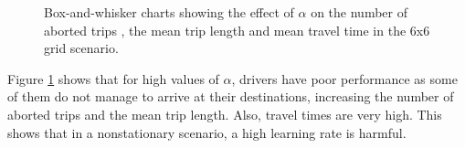 \documentclass{RITA}
\begin{document}
\begin{figure}[ht]
  \centering
  \caption{Box-and-whisker charts showing the effect of $\alpha$ on the number of aborted trips , the mean trip length  and mean travel time  in the 6x6 grid scenario.}
  \label{fig:qLearningAlpha-grid}
\end{figure}

Figure \ref{fig:qLearningAlpha-grid} shows that for high values of $\alpha$, drivers have poor performance as some of them do not manage to arrive at their destinations, increasing the number of aborted trips and the mean trip length. Also, travel times are very high. This shows that in a nonstationary scenario, a high learning rate is harmful.
\end{document}
